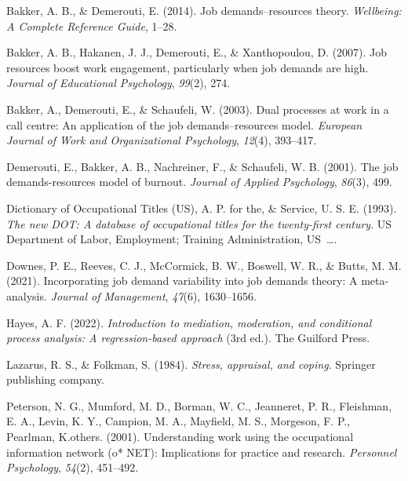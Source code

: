 \documentclass[
  man]{apa6}
\newlength{\cslhangindent}
\newlength{\cslentryspacingunit} %
\newenvironment{CSLReferences}[2] %
 {%
  \setlength{\parindent}{0pt}
  \ifodd #1
  \let\oldpar\par
  \def\par{\hangindent=\cslhangindent\oldpar}
  \fi
  \setlength{\parskip}{#2\cslentryspacingunit}
 }%
 {}
\begin{document}
\hypertarget{refs}{}
\begin{CSLReferences}{1}{0}
\leavevmode{}%
Bakker, A. B., \& Demerouti, E. (2014). Job demands--resources theory. \emph{Wellbeing: A Complete Reference Guide}, 1--28.

\leavevmode{}%
Bakker, A. B., Hakanen, J. J., Demerouti, E., \& Xanthopoulou, D. (2007). Job resources boost work engagement, particularly when job demands are high. \emph{Journal of Educational Psychology}, \emph{99}(2), 274.

\leavevmode{}%
Bakker, A., Demerouti, E., \& Schaufeli, W. (2003). Dual processes at work in a call centre: An application of the job demands--resources model. \emph{European Journal of Work and Organizational Psychology}, \emph{12}(4), 393--417.

\leavevmode{}%
Demerouti, E., Bakker, A. B., Nachreiner, F., \& Schaufeli, W. B. (2001). The job demands-resources model of burnout. \emph{Journal of Applied Psychology}, \emph{86}(3), 499.

\leavevmode{}%
Dictionary of Occupational Titles (US), A. P. for the, \& Service, U. S. E. (1993). \emph{The new DOT: A database of occupational titles for the twenty-first century}. US Department of Labor, Employment; Training Administration, US~\ldots.

\leavevmode{}%
Downes, P. E., Reeves, C. J., McCormick, B. W., Boswell, W. R., \& Butts, M. M. (2021). Incorporating job demand variability into job demands theory: A meta-analysis. \emph{Journal of Management}, \emph{47}(6), 1630--1656.

\leavevmode{}%
Hayes, A. F. (2022). \emph{Introduction to mediation, moderation, and conditional process analysis: A regression-based approach} (3rd ed.). The Guilford Press.

\leavevmode{}%
Lazarus, R. S., \& Folkman, S. (1984). \emph{Stress, appraisal, and coping}. Springer publishing company.

\leavevmode{}%
Peterson, N. G., Mumford, M. D., Borman, W. C., Jeanneret, P. R., Fleishman, E. A., Levin, K. Y., Campion, M. A., Mayfield, M. S., Morgeson, F. P., Pearlman, K.others. (2001). Understanding work using the occupational information network (o* NET): Implications for practice and research. \emph{Personnel Psychology}, \emph{54}(2), 451--492.


\end{CSLReferences}
\end{document}
